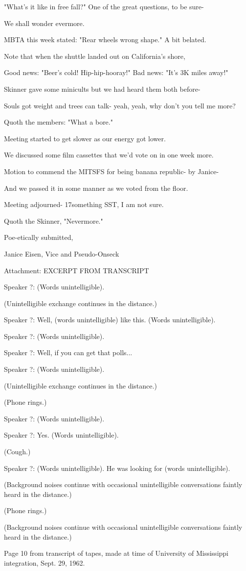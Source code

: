 \documentclass[12pt]{article}
\begin{document}
"What's it like in free fall?" One of the great questions, to be sure-

We shall wonder evermore.

MBTA this week stated: "Rear wheels wrong shape." A bit belated.

Note that when the shuttle landed out on California's shore,

Good news: "Beer's cold! Hip-hip-hooray!" Bad news: "It's 3K miles away!"

Skinner gave some minicults but we had heard them both before-

Souls got weight and trees can talk- yeah, yeah, why don't you tell me more?

Quoth the members: "What a bore."

Meeting started to get slower as our energy got lower.

We discussed some film cassettes that we'd vote on in one week more.

Motion to commend the MITSFS for being banana republic- by Janice-

And we passed it in some manner as we voted from the floor.

Meeting adjourned- 17something SST, I am not sure.

Quoth the Skinner, "Nevermore."

\vspace{18pt}

\centerline{Poe-etically submitted,}
\centerline{Janice Eisen, Vice and Pseudo-Onseck}

Attachment: EXCERPT FROM TRANSCRIPT

Speaker ?: (Words unintelligible).

(Unintelligible exchange continues in the distance.)

Speaker ?: Well, (words unintelligible) like this. (Words unintelligible).

Speaker ?: (Words unintelligible).

Speaker ?: Well, if you can get that polls...

Speaker ?: (Words unintelligible).

(Unintelligible exchange continues in the distance.)

(Phone rings.)

Speaker ?: (Words unintelligible).

Speaker ?: Yes. (Words unintelligible).

(Cough.)

Speaker ?: (Words unintelligible). He was looking for (words unintelligible).

(Background noises continue with occasional unintelligible conversations faintly heard in the distance.)

(Phone rings.)

(Background noises continue with occasional unintelligible conversations faintly heard in the distance.)

Page 10 from transcript of tapes, made at time of University of Mississippi integration, Sept. 29, 1962.
\end{document}
